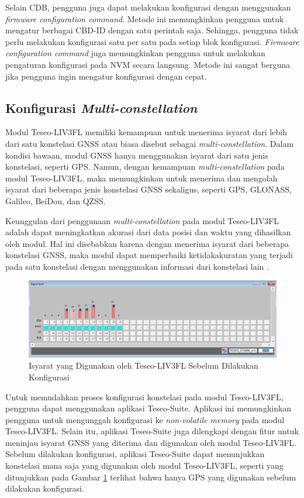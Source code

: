 Selain CDB, pengguna juga dapat melakukan konfigurasi dengan menggunakan \textit{firmware configuration command}. Metode ini memungkinkan pengguna untuk mengatur berbagai CBD-ID dengan satu perintah saja. Sehingga, pengguna tidak perlu melakukan konfigurasi satu per satu pada setiap blok konfigurasi. \textit{Firmware configuration command} juga memungkinkan pengguna untuk melakukan pengaturan konfigurasi pada NVM secara langsung. Metode ini sangat berguna jika pengguna ingin mengatur konfigurasi dengan cepat.

\subsection{Konfigurasi \textit{Multi-constellation}}
Modul Teseo-LIV3FL memiliki kemampuan untuk menerima isyarat dari lebih dari satu konstelasi GNSS atau biasa disebut sebagai \textit{multi-constellation}. Dalam kondisi bawaan, modul GNSS hanya menggunakan isyarat dari satu jenis konstelasi, seperti GPS. Namun, dengan kemampuan \textit{multi-constellation} pada modul Teseo-LIV3FL, maka memungkinkan untuk menerima dan mengolah isyarat dari beberapa jenis konstelasi GNSS sekaligus, seperti GPS, GLONASS, Galileo, BeiDou, dan QZSS.
 
Keunggulan dari penggunaan \textit{multi-constellation} pada modul Teseo-LIV3FL adalah dapat meningkatkan akurasi dari data posisi dan waktu yang dihasilkan oleh modul. Hal ini disebabkan karena dengan menerima isyarat dari beberapa konstelasi GNSS, maka modul dapat memperbaiki ketidakakuratan yang terjadi pada satu konstelasi dengan menggunakan informasi dari konstelasi lain \cite{An2020}.
 
\begin{figure}[H]
	\centering
	\includegraphics[width=14cm]{contents/chapter-3/setting-konstelasi/sebelum-konfigurasi.png}
	\caption{Isyarat yang Digunakan oleh Teseo-LIV3FL Sebelum Dilakukan Konfigurasi}
	\label{Fig: sebelum-konfigurasi}
\end{figure}

 Untuk memudahkan proses konfigurasi konstelasi pada modul Teseo-LIV3FL, pengguna dapat menggunakan aplikasi Teseo-Suite. Aplikasi ini memungkinkan pengguna untuk mengunggah konfigurasi ke \textit{non-volatile memory} pada modul Teseo-LIV3FL. Selain itu, aplikasi Teseo-Suite juga dilengkapi dengan fitur untuk meninjau isyarat GNSS yang diterima dan digunakan oleh modul Teseo-LIV3FL. Sebelum dilakukan konfigurasi, aplikasi Teseo-Suite dapat menunjukkan konstelasi mana saja yang digunakan oleh modul Teseo-LIV3FL, seperti yang ditunjukkan pada Gambar \ref{Fig: sebelum-konfigurasi} terlihat bahwa hanya GPS yang digunakan sebelum dilakukan konfigurasi.
 

